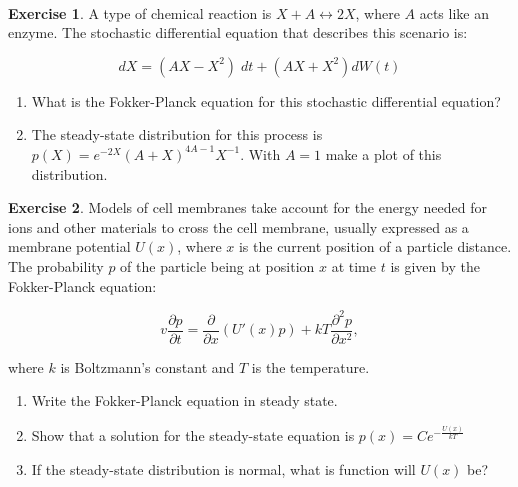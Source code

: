 \documentclass[
]{book}
\theoremstyle{definition}
\theoremstyle{definition}
\theoremstyle{definition}
\newtheorem{exercise}{Exercise}[chapter]
\theoremstyle{remark}
\begin{document}
~

\begin{exercise}
\protect\hypertarget{exr:unnamed-chunk-364}{}{\label{exr:unnamed-chunk-364} }A type of chemical reaction is \(X + A \leftrightarrow 2X\), where \(A\) acts like an enzyme. The stochastic differential equation that describes this scenario is:

\begin{equation}
dX = \left( A X - X^{2} \right) \; dt + \left( AX + X^{2} \right) dW(t)
\end{equation}

\begin{enumerate}[label=\alph*.]
\item What is the Fokker-Planck equation for this stochastic differential equation?
\item The steady-state distribution for this process is $p(X) = e^{-2X}(A+X)^{4A-1}X^{-1}$.  With $A=1$ make a plot of this distribution.
\end{enumerate}
\end{exercise}

\begin{exercise}
\protect\hypertarget{exr:unnamed-chunk-365}{}{\label{exr:unnamed-chunk-365} }Models of cell membranes take account for the energy needed for ions and other materials to cross the cell membrane, usually expressed as a membrane potential \(U(x)\), where \(x\) is the current position of a particle distance. The probability \(p\) of the particle being at position \(x\) at time \(t\) is given by the Fokker-Planck equation:

\begin{equation}
v \frac{\partial p}{\partial t} = \frac{\partial}{\partial x} \left( U'(x) p \right) + k T \frac{\partial^{2} p}{\partial x^{2}},
\end{equation}

where \(k\) is Boltzmann's constant and \(T\) is the temperature.

\begin{enumerate}[label=\alph*.]
\item Write the Fokker-Planck equation in steady state.
\item Show that a solution for the steady-state equation is $p(x)=C e^{-\frac{U(x)}{kT}}$
\item If the steady-state distribution is normal, what is function will $U(x)$ be?
\end{enumerate}
\end{exercise}
\end{document}
